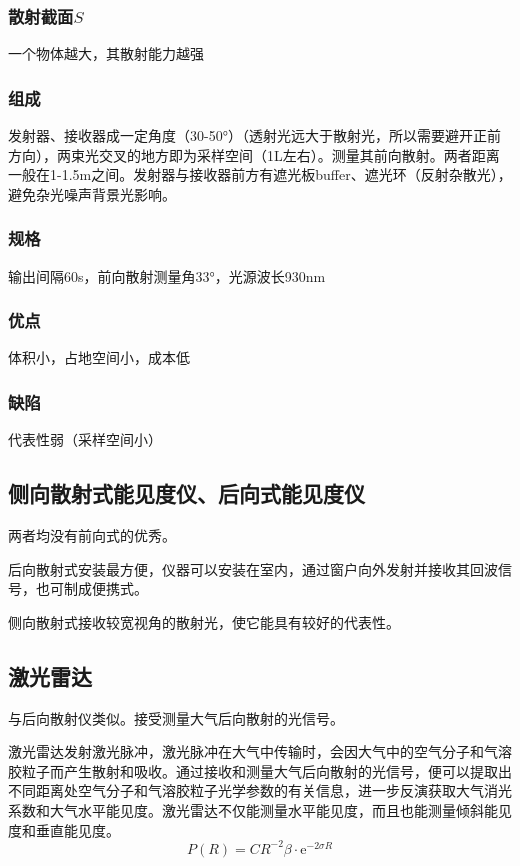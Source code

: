 \documentclass[UTF8,11pt]{ctexbook}
\begin{document}
\subsubsection{散射截面\(S\)}

一个物体越大，其散射能力越强

\subsubsection{组成}

发射器、接收器成一定角度（30-50°）（透射光远大于散射光，所以需要避开正前方向），两束光交叉的地方即为采样空间（1L左右）。测量其前向散射。两者距离一般在1-1.5m之间。发射器与接收器前方有遮光板buffer、遮光环（反射杂散光），避免杂光噪声背景光影响。

\subsubsection{规格}

输出间隔60s，前向散射测量角33°，光源波长930nm

\subsubsection{优点}

体积小，占地空间小，成本低

\subsubsection{缺陷}

代表性弱（采样空间小）

\subsection{侧向散射式能见度仪、后向式能见度仪}

两者均没有前向式的优秀。

后向散射式安装最方便，仪器可以安装在室内，通过窗户向外发射并接收其回波信号，也可制成便携式。

侧向散射式接收较宽视角的散射光，使它能具有较好的代表性。

\subsection{激光雷达}

与后向散射仪类似。接受测量大气后向散射的光信号。

激光雷达发射激光脉冲，激光脉冲在大气中传输时，会因大气中的空气分子和气溶胶粒子而产生散射和吸收。通过接收和测量大气后向散射的光信号，便可以提取出不同距离处空气分子和气溶胶粒子光学参数的有关信息，进一步反演获取大气消光系数和大气水平能见度。激光雷达不仅能测量水平能见度，而且也能测量倾斜能见度和垂直能见度。
\[
P(R)=CR^{-2}\beta\cdot\mathrm{e}^{-2\sigma R}
\]
	
\end{document}
